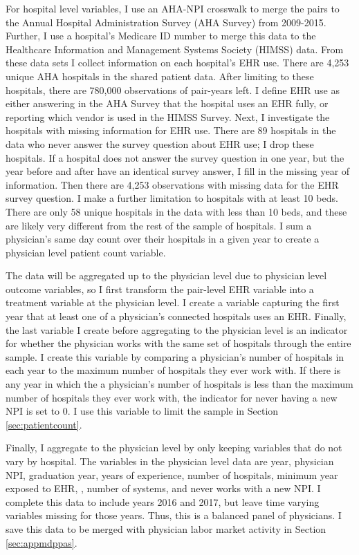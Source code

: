 \documentclass[12pt]{article}
\begin{document}
For hospital level variables, I use an AHA-NPI crosswalk to merge the pairs to the Annual Hospital Administration Survey (AHA Survey) from 2009-2015. Further, I use a hospital's Medicare ID number to merge this data to the Healthcare Information and Management Systems Society (HIMSS) data. From these data sets I collect information on each hospital's EHR use. There are 4,253 unique AHA hospitals in the shared patient data. After limiting to these hospitals, there are 780,000 observations of pair-years left. I define EHR use as either answering in the AHA Survey that the hospital uses an EHR fully, or reporting which vendor is used in the HIMSS Survey. Next, I investigate the hospitals with missing information for EHR use. There are 89 hospitals in the data who never answer the survey question about EHR use; I drop these hospitals. If a hospital does not answer the survey question in one year, but the year before and after have an identical survey answer, I fill in the missing year of information. Then there are 4,253 observations with missing data for the EHR survey question. I make a further limitation to hospitals with at least 10 beds. There are only 58 unique hospitals in the data with less than 10 beds, and these are likely very different from the rest of the sample of hospitals. I sum a physician's same day count over their hospitals in a given year to create a physician level patient count variable. 

The data will be aggregated up to the physician level due to physician level outcome variables, so I first transform the pair-level EHR variable into a treatment variable at the physician level. I create a variable capturing the first year that at least one of a physician's connected hospitals uses an EHR. Finally, the last variable I create before aggregating to the physician level is an indicator for whether the physician works with the same set of hospitals through the entire sample. I create this variable by comparing a physician's number of hospitals in each year to the maximum number of hospitals they ever work with. If there is any year in which the a physician's number of hospitals is less than the maximum number of hospitals they ever work with, the indicator for never having a new NPI is set to 0. I use this variable to limit the sample in Section \ref{sec:patientcount}. 

Finally, I aggregate to the physician level by only keeping variables that do not vary by hospital. The variables in the physician level data are year, physician NPI, graduation year, years of experience, number of hospitals, minimum year exposed to EHR, , number of systems, and never works with a new NPI. I complete this data to include years 2016 and 2017, but leave time varying variables missing for those years. Thus, this is a balanced panel of physicians. I save this data to be merged with physician labor market activity in Section \ref{sec:appmdppas}.
\end{document}
